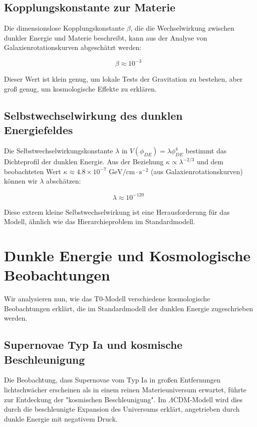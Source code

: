 \documentclass[a4paper,12pt]{article}
\begin{document}
\subsection{Kopplungskonstante zur Materie}

Die dimensionslose Kopplungskonstante $\beta$, die die Wechselwirkung zwischen dunkler Energie und Materie beschreibt, kann aus der Analyse von Galaxienrotationskurven abgeschätzt werden:

\begin{equation}
	\beta \approx 10^{-3}
\end{equation}

Dieser Wert ist klein genug, um lokale Tests der Gravitation zu bestehen, aber groß genug, um kosmologische Effekte zu erklären.

\subsection{Selbstwechselwirkung des dunklen Energiefeldes}

Die Selbstwechselwirkungskonstante $\lambda$ in $V(\phi_{DE}) = \lambda \phi_{DE}^4$ bestimmt das Dichteprofil der dunklen Energie. Aus der Beziehung $\kappa \propto \lambda^{-2/3}$ und dem beobachteten Wert $\kappa \approx 4.8 \times 10^{-7} \text{ GeV/cm} \cdot \text{s}^{-2}$ (aus Galaxienrotationskurven) können wir $\lambda$ abschätzen:

\begin{equation}
	\lambda \approx 10^{-120}
\end{equation}

Diese extrem kleine Selbstwechselwirkung ist eine Herausforderung für das Modell, ähnlich wie das Hierarchieproblem im Standardmodell.

\section{Dunkle Energie und Kosmologische Beobachtungen}

Wir analysieren nun, wie das T0-Modell verschiedene kosmologische Beobachtungen erklärt, die im Standardmodell der dunklen Energie zugeschrieben werden.

\subsection{Supernovae Typ Ia und kosmische Beschleunigung}

Die Beobachtung, dass Supernovae vom Typ Ia in großen Entfernungen lichtschwächer erscheinen als in einem reinen Materieuniversum erwartet, führte zur Entdeckung der "kosmischen Beschleunigung". Im $\Lambda$CDM-Modell wird dies durch die beschleunigte Expansion des Universums erklärt, angetrieben durch dunkle Energie mit negativem Druck.
\end{document}
